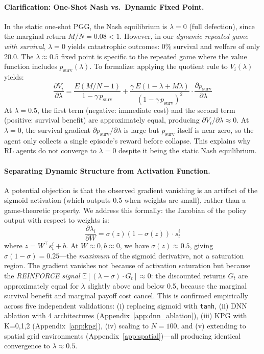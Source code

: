 \documentclass{article}
\begin{document}
\paragraph{Clarification: One-Shot Nash vs.\ Dynamic Fixed Point.}
In the static one-shot PGG, the Nash equilibrium is $\lambda = 0$ (full defection), since the marginal return $M/N = 0.08 < 1$.
However, in our \emph{dynamic repeated game with survival}, $\lambda = 0$ yields catastrophic outcomes: 0\% survival and welfare of only 20.0.
The $\lambda \approx 0.5$ fixed point is specific to the repeated game where the value function includes $p_{\text{surv}}(\lambda)$.
To formalize: applying the quotient rule to $V_i(\lambda)$ yields:
\begin{equation}
\frac{\partial V_i}{\partial \lambda} = \frac{E(M/N - 1)}{1 - \gamma\, p_{\text{surv}}} + \frac{\gamma\, E(1 - \lambda + M\lambda)}{(1 - \gamma\, p_{\text{surv}})^2} \cdot \frac{\partial p_{\text{surv}}}{\partial \lambda}
\end{equation}
At $\lambda = 0.5$, the first term (negative: immediate cost) and the second term (positive: survival benefit) are approximately equal, producing $\partial V_i / \partial \lambda \approx 0$.
At $\lambda = 0$, the survival gradient $\partial p_{\text{surv}}/\partial \lambda$ is large but $p_{\text{surv}}$ itself is near zero, so the agent only collects a single episode's reward before collapse.
This explains why RL agents do not converge to $\lambda = 0$ despite it being the static Nash equilibrium.

\paragraph{Separating Dynamic Structure from Activation Function.}
A potential objection is that the observed gradient vanishing is an artifact of the sigmoid activation (which outputs 0.5 when weights are small), rather than a game-theoretic property.
We address this formally: the Jacobian of the policy output with respect to weights is:
\begin{equation}
\frac{\partial \lambda_i}{\partial W} = \sigma(z)(1-\sigma(z)) \cdot s_t^i
\end{equation}
where $z = W^\top s_t^i + b$.
At $W \approx 0, b \approx 0$, we have $\sigma(z) \approx 0.5$, giving $\sigma(1-\sigma) = 0.25$---the \emph{maximum} of the sigmoid derivative, not a saturation region.
The gradient vanishes not because of activation saturation but because the \emph{REINFORCE signal} $\mathbb{E}[(\lambda - \sigma) \cdot G_t] \approx 0$: the discounted returns $G_t$ are approximately equal for $\lambda$ slightly above and below 0.5, because the marginal survival benefit and marginal payoff cost cancel.
This is confirmed empirically across five independent validations: (i) replacing sigmoid with \texttt{tanh}, (ii) DNN ablation with 4 architectures (Appendix~\ref{app:dnn_ablation}), (iii) KPG with K=0,1,2 (Appendix~\ref{app:kpg}), (iv) scaling to $N=100$, and (v) extending to spatial grid environments (Appendix~\ref{app:spatial})---all producing identical convergence to $\lambda \approx 0.5$.
\end{document}
